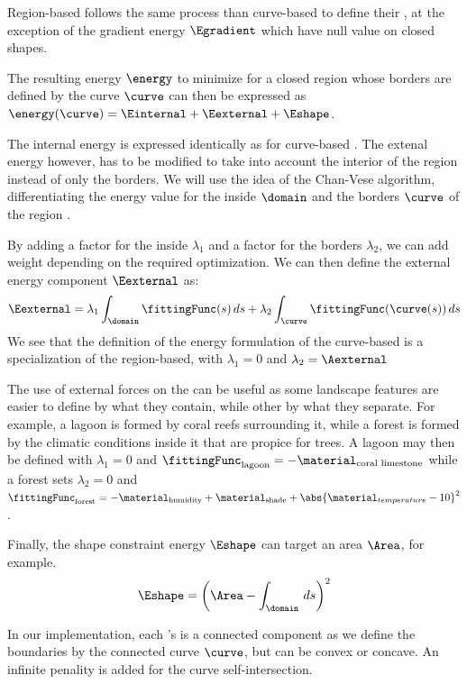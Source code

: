 Region-based  follows the same process than curve-based  to define their , at the exception of the gradient energy $\Egradient$ which have null value on closed shapes. 

The resulting energy $\energy$ to minimize for a closed region whose borders are defined by the curve $\curve$ can then be expressed as $\energy(\curve) = \Einternal + \Eexternal + \Eshape$.

The internal energy is expressed identically as for curve-based . The extenal energy however, has to be modified to take into account the interior of the region instead of only the borders. We will use the idea of the Chan-Vese algorithm, differentiating the energy value for the inside $\domain$ and the borders $\curve$ of the region \cite{Chan2001, Getreuer2012}.

By adding a factor for the inside $\lambda_1$ and a factor for the borders $\lambda_2$, we can add weight depending on the required optimization. We can then define the external energy component $\Eexternal$ as:
\begin{align}
    \Eexternal = \lambda_1 \int_{\domain}{ \fittingFunc(s) \, ds } + \lambda_2 \int_{\curve}{ \fittingFunc(\curve(s)) \, ds }
\end{align}
We see that the definition of the energy formulation of the curve-based  is a specialization of the region-based, with $\lambda_1 = 0$ and $\lambda_2 = \Aexternal$

The use of external forces on the  can be useful as some landscape features are easier to define by what they contain, while other by what they separate. For example, a lagoon is formed by coral reefs surrounding it, while a forest is formed by the climatic conditions inside it that are propice for trees. A lagoon may then be defined with $\lambda_1 = 0$ and $\fittingFunc_{\text{lagoon}} = -\material_{\text{coral limestone}}$ while a forest sets $\lambda_2 = 0$ and $\fittingFunc_{\text{forest}} = -\material_{\text{humidity}} + \material_{\text{shade}} + \abs{\material_{temperature} - 10}^2$.

Finally, the shape constraint energy $\Eshape$ can target an area $\Area$, for example.
\begin{align}
    \Eshape = \left( \Area - \int_{\domain}{ \, ds } \right)^2
\end{align}

In our implementation, each 's  is a connected component as we define the boundaries by the connected curve $\curve$, but can be convex or concave. An infinite penality is added for the curve self-intersection.


